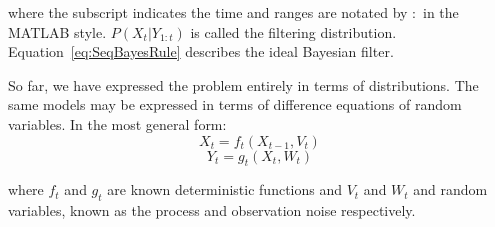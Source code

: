 where the subscript indicates the time and ranges are notated by $:$ in the MATLAB style. $P(X_t|Y_{1:t})$ is called the filtering distribution. Equation~\ref{eq:SeqBayesRule} describes the ideal Bayesian filter.




So far, we have expressed the problem entirely in terms of distributions. The same models may be expressed in terms of difference equations of random variables. In the most general form:
\begin{equation}
X_t = f_t(X_{t-1}, V_t)
\label{eq:FilterEq1}
\end{equation}
\begin{equation}
Y_t = g_t(X_t, W_t)
\label{eq:FilterEq2}
\end{equation}

where $f_t$ and $g_t$ are known deterministic functions and $V_t$ and $W_t$ and random variables, known as the process and observation noise respectively.